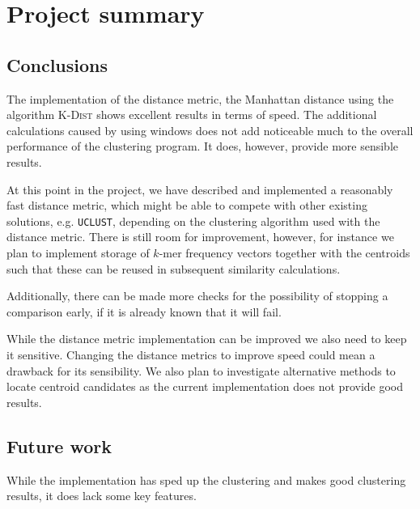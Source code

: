 \section{Project summary}

\subsection{Conclusions}
\label{sec:conclusions}

The implementation of the distance metric, the Manhattan distance using the
algorithm \textsc{K-Dist} shows excellent results in terms of speed. The
additional calculations caused by using windows does not add noticeable much
to the overall performance of the clustering program. It does, however,
provide more sensible results.

At this point in the project, we have described and implemented a reasonably
fast distance metric, which might be able to compete with other existing
solutions, e.g. \texttt{UCLUST}, depending on the clustering algorithm used
with the distance metric. There is still room for improvement, however, for
instance we plan to implement storage of $k$-mer frequency vectors together
with the centroids such that these can be reused in subsequent similarity
calculations.

Additionally, there can be made more checks for the possibility of stopping a
comparison early, if it is already known that it will fail.

While the distance metric implementation can be improved we also need to keep
it sensitive. Changing the distance metrics to improve speed could mean a
drawback for its sensibility. We also plan to investigate alternative methods
to locate centroid candidates as the current implementation does not provide
good results.


\subsection{Future work}
\label{sec:future_work}

While the implementation has sped up the clustering and makes good clustering
results, it does lack some key features.

